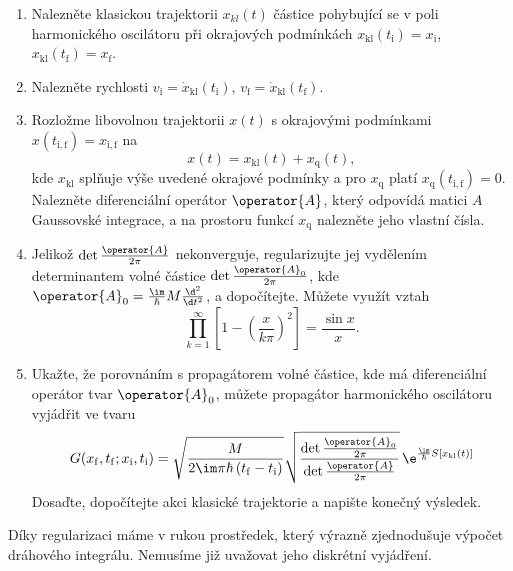 \begin{enumerate}
\item Nalezněte klasickou trajektorii $x_{kl}(t)$ částice pohybující se v poli harmonického oscilátoru
při okrajových podmínkách $x_{\mathrm{kl}}(t_{\mathrm{i}})=x_{\mathrm{i}}$, $x_{\mathrm{kl}}(t_{\mathrm{f}})=x_{\mathrm{f}}$.

\item Nalezněte rychlosti $v_{\mathrm{i}}=\dot{x}_{\mathrm{kl}}(t_{\mathrm{i}})$, $v_{\mathrm{f}}=\dot{x}_{\mathrm{kl}}(t_{\mathrm{f}})$.

\item Rozložme libovolnou trajektorii $x(t)$ s okrajovými podmínkami $x(t_{\mathrm{i,f}})=x_{\mathrm{i,f}}$ na 
\begin{equation}
x(t)=x_{\mathrm{kl}}(t)+x_{\mathrm{q}}(t),
\end{equation}
kde $x_{\mathrm{kl}}$ splňuje výše uvedené okrajové podmínky a pro $x_{\mathrm{q}}$ platí $x_{\mathrm{q}}(t_{\mathrm{i,f}})=0$.
Nalezněte diferenciální operátor $\operator{A}$, který odpovídá matici $A$ Gaussovské integrace, 
a na prostoru funkcí $x_{\mathrm{q}}$ nalezněte jeho vlastní čísla.

\item Jelikož $\det{\frac{\operator{A}}{2\pi}}$ nekonverguje, regularizujte jej vydělením determinantem volné částice $\det{\frac{\operator{A}_{0}}{2\pi}}$,
kde $\operator{A}_{0}=\frac{\im}{\hbar}M\frac{\d^{2}}{\d t^{2}}$, a dopočítejte. 
Můžete využít vztah
\begin{equation}
\prod_{k=1}^{\infty}\left[1-\left(\frac{x}{k\pi}\right)^{2}\right]=\frac{\sin{x}}{x}.
\end{equation}

\item Ukažte, že porovnáním s propagátorem volné částice, kde má diferenciální operátor tvar $\operator{A}_{0}$, 
můžete propagátor harmonického oscilátoru vyjádřit ve tvaru
\begin{equation}
G(x_{\mathrm{f}}, t_{\mathrm{f}}; x_{\mathrm{i}}, t_{\mathrm{i}})=\sqrt{\frac{M}{2\im\pi\hbar\left(t_{\mathrm{f}}-t_{\mathrm{i}}\right)}}
\sqrt{\frac{\det{\frac{\operator{A}_{0}}{2\pi}}}{\det{\frac{\operator{A}}{2\pi}}}}\,
\e^{\frac{\im}{\hbar}S[x_{\mathrm{kl}}(t)]}\nonumber
\end{equation}
Dosaďte, dopočítejte akci klasické trajektorie a napište konečný výsledek.
\end{enumerate}

Díky regularizaci máme v rukou prostředek, který výrazně zjednodušuje výpočet dráhového integrálu. 
Nemusíme již uvažovat jeho diskrétní vyjádření. 

